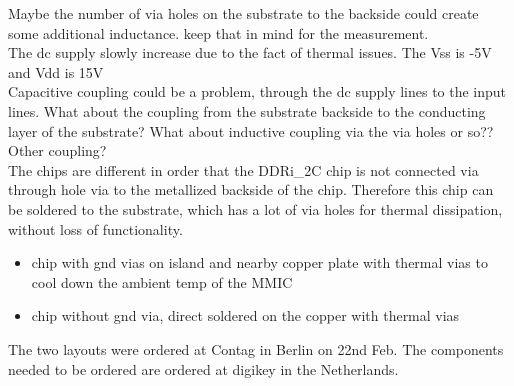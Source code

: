 Maybe the number of via holes on the substrate to the backside could create some additional inductance. keep that in mind for the measurement.\\
The dc supply slowly increase due to the fact of thermal issues. 
The Vss is -5V and Vdd is 15V\\
Capacitive coupling could be a problem, through the dc supply lines to the input lines.
What about the coupling from the substrate backside to the conducting layer of the substrate? 
What about inductive coupling via the via holes or so??
Other coupling?\\
The chips are different in order that the DDRi\_2C chip is not connected via through hole via to the metallized backside of the chip. 
Therefore this chip can be soldered to the substrate, which has a lot of via holes for thermal dissipation, without loss of functionality.

	\begin{itemize}
		\item chip with gnd vias on island and nearby copper plate with thermal vias to cool down the ambient temp of the MMIC
		\item chip without gnd via, direct soldered on the copper with thermal vias
	\end{itemize}

The two layouts were ordered at Contag in Berlin on 22nd Feb.
The components needed to be ordered are ordered at digikey in the Netherlands.
